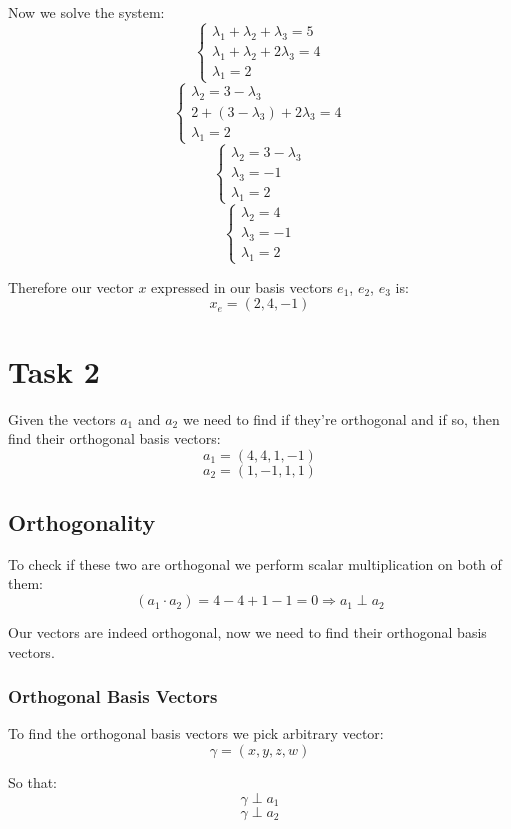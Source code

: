 \documentclass[11pt]{article}
\begin{document}
Now we solve the system:
\[
\left\{
\begin{aligned}
\lambda_1 + \lambda_2 + \lambda_3 = 5 \\
\lambda_1 + \lambda_2 + 2 \lambda_3 = 4 \\
\lambda_1 = 2
\end{aligned}
\]
\[
\left\{
\begin{aligned}
\lambda_2 = 3 - \lambda_3 \\
2 + (3 - \lambda_3) + 2 \lambda_3 = 4 \\
\lambda_1 = 2
\end{aligned}
\]
\[
\left\{
\begin{aligned}
\lambda_2 = 3 - \lambda_3 \\
\lambda_3 = -1 \\
\lambda_1 = 2
\end{aligned}
\]
\[
\left\{
\begin{aligned}
\lambda_2 = 4 \\
\lambda_3 = -1 \\
\lambda_1 = 2
\end{aligned}
\]

Therefore our vector \(x\) expressed in our basis vectors \(e_1\), \(e_2\), \(e_3\) is:
\[
x_e = (2,4,-1)
\]

\newpage
\section{Task 2}
\label{sec:org3879951}
Given the vectors \(a_1\) and \(a_2\) we need to find if they're orthogonal and if so, then find their orthogonal basis vectors:
\[
a_1 = (4,4,1,-1)
\]
\[
a_2 = (1,-1,1,1)
\]
\subsection{Orthogonality}
\label{sec:orgafa7d12}
To check if these two are orthogonal we perform scalar multiplication on both of them:
\[
(a_1 \cdot a_2) = 4 - 4 + 1 - 1 = 0 \Rightarrow a_1 \perp a_2
\]

Our vectors are indeed orthogonal, now we need to find their orthogonal basis vectors.
\subsubsection{Orthogonal Basis Vectors}
\label{sec:org3b7daa2}
To find the orthogonal basis vectors we pick arbitrary vector:
\[
\gamma=(x,y,z,w)
\]

So that:
\[
\gamma \perp a_1
\]
\[
\gamma \perp a_2
\]
\end{document}
